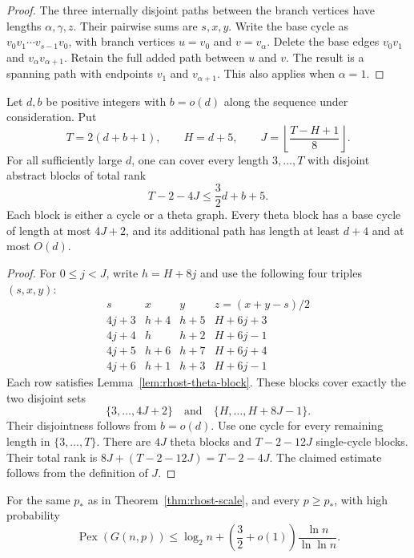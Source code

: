 \begin{proof}
The three internally disjoint paths between the branch vertices have lengths
$\alpha,\gamma,z$.
Their pairwise sums are $s,x,y$.
Write the base cycle as $v_0v_1\cdots v_{s-1}v_0$, with branch vertices
$u=v_0$ and $v=v_\alpha$.
Delete the base edges $v_0v_1$ and $v_\alpha v_{\alpha+1}$.
Retain the full added path between $u$ and $v$.
The result is a spanning path with endpoints $v_1$ and $v_{\alpha+1}$.
This also applies when $\alpha=1$.
\end{proof}

\begin{lemma}
\label{lem:rhost-theta-interval}
Let $d,b$ be positive integers with $b=o(d)$ along the sequence under consideration.
Put
\[
 T=2(d+b+1),\qquad H=d+5,\qquad
 J=\left\lfloor\frac{T-H+1}{8}\right\rfloor.
\]
For all sufficiently large $d$, one can cover every length $3,\ldots,T$
with disjoint abstract blocks of total rank
\[
 T-2-4J\le\frac32d+b+5.
\]
Each block is either a cycle or a theta graph.
Every theta block has a base cycle of length at most $4J+2$,
and its additional path has length at least $d+4$ and at most $O(d)$.
\end{lemma}

\begin{proof}
For $0\le j<J$, write $h=H+8j$ and use the following four triples $(s,x,y)$:
\[
 \begin{array}{c|c|c|c}
 s&x&y&z=(x+y-s)/2\\ \hline
 4j+3&h+4&h+5&H+6j+3\\
 4j+4&h&h+2&H+6j-1\\
 4j+5&h+6&h+7&H+6j+4\\
 4j+6&h+1&h+3&H+6j-1
 \end{array}
\]
Each row satisfies Lemma~\ref{lem:rhost-theta-block}.
These blocks cover exactly the two disjoint sets
\[
 \{3,\ldots,4J+2\}\quad\text{and}\quad\{H,\ldots,H+8J-1\}.
\]
Their disjointness follows from $b=o(d)$.
Use one cycle for every remaining length in $\{3,\ldots,T\}$.
There are $4J$ theta blocks and $T-2-12J$ single-cycle blocks.
Their total rank is $8J+(T-2-12J)=T-2-4J$.
The claimed estimate follows from the definition of $J$.
\end{proof}

\begin{theorem}
\label{thm:rhost-three-halves}
For the same $p_*$ as in Theorem~\ref{thm:rhost-scale}, and every $p\ge p_*$,
with high probability
\[
 \operatorname{Pex}(G(n,p))
 \le\log_2n+\left(\frac32+o(1)\right)\frac{\ln n}{\ln\ln n}.
\]
\end{theorem}


